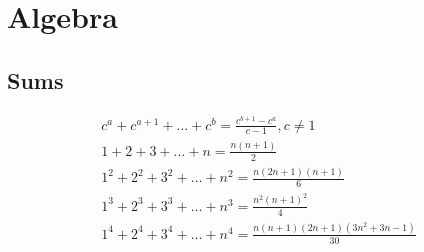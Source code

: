 \section{Algebra}

\subsection{Sums}
\begin{equation}
  \begin{array}{c}
    c^a + c^{a+1} + \dots + c^{b} = \frac{c^{b+1} - c^a}{c-1}, c \neq 1 \\
    1 + 2 + 3 + \dots + n = \frac{n(n+1)}{2} \\
    1^2 + 2^2 + 3^2 + \dots + n^2 = \frac{n(2n+1)(n+1)}{6} \\
    1^3 + 2^3 + 3^3 + \dots + n^3 = \frac{n^2(n+1)^2}{4} \\
    1^4 + 2^4 + 3^4 + \dots + n^4 = \frac{n(n+1)(2n+1)(3n^2 + 3n - 1)}{30}
  \end{array}
\end{equation}







